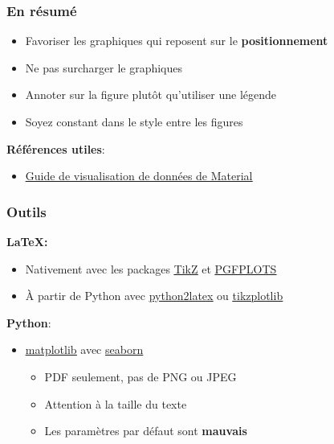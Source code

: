 \documentclass[aspectratio=169]{beamer}
\begin{document}
\begin{frame}[c]\frametitle{En résumé}
    
\begin{itemize}
	\item Favoriser les graphiques qui reposent sur le \textbf{positionnement}
	\item Ne pas surcharger le graphiques
	\item Annoter sur la figure plutôt qu'utiliser une légende
	\item Soyez constant dans le style entre les figures
\end{itemize}

\textbf{Références utiles}:\vspace{-\parskip}    
\begin{itemize}
	\item \href{https://material.io/design/communication/data-visualization.html}{\underline{Guide de visualisation de données de Material}}
\end{itemize}

\end{frame}



\begin{frame}[c]\frametitle{Outils}
    
\textbf{LaTeX:}\vspace{-\parskip}
\begin{itemize}
	\item Nativement avec les packages \href{https://ctan.mirror.colo-serv.net/graphics/pgf/base/doc/pgfmanual.pdf}{\underline{TikZ}} et \href{https://mirror.its.dal.ca/ctan/graphics/pgf/contrib/pgfplots/doc/pgfplots.pdf}{\underline{PGFPLOTS}}
	\item À partir de Python avec \href{https://github.com/jsleb333/python2latex}{\underline{python2latex}} ou \href{https://github.com/nschloe/tikzplotlib}{\underline{tikzplotlib}}
\end{itemize}

\textbf{Python}:\vspace{-\parskip}
\begin{itemize}
	\item \href{https://matplotlib.org/}{\underline{matplotlib}} avec \href{https://seaborn.pydata.org/index.html}{\underline{seaborn\vphantom{p}}}
	\vspace{1.5mm}
	\begin{itemize}
		\item PDF seulement, pas de PNG ou JPEG
		\item Attention à la taille du texte
		\item Les paramètres par défaut sont \textbf{mauvais}
	\end{itemize}
\end{itemize}

\end{frame}
\end{document}
